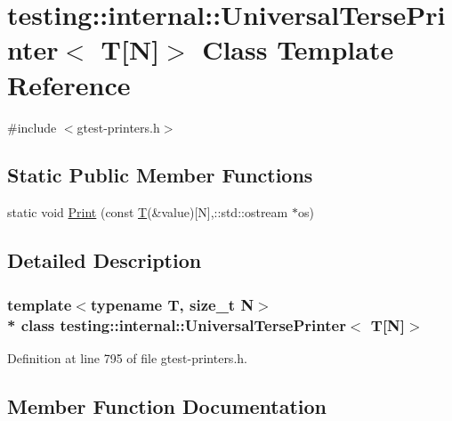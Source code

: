 \hypertarget{classtesting_1_1internal_1_1_universal_terse_printer_3_01_t[_n]_4}{}\section{testing\+:\+:internal\+:\+:Universal\+Terse\+Printer$<$ T\mbox{[}N\mbox{]}$>$ Class Template Reference}
\label{classtesting_1_1internal_1_1_universal_terse_printer_3_01_t[_n]_4}


{\ttfamily \#include $<$gtest-\/printers.\+h$>$}

\subsection*{Static Public Member Functions}
\begin{DoxyCompactItemize}
\item 
static void \hyperlink{classtesting_1_1internal_1_1_universal_terse_printer_3_01_t[_n]_4_ab86be2fbff7bb8fb2113e9ade3899a56}{Print} (const \hyperlink{functions__7_8js_adf1f3edb9115acb0a1e04209b7a9937b}{T}(\&value)\mbox{[}N\mbox{]},\+::std\+::ostream $\ast$os)
\end{DoxyCompactItemize}


\subsection{Detailed Description}
\subsubsection*{template$<$typename T, size\+\_\+t N$>$\\*
class testing\+::internal\+::\+Universal\+Terse\+Printer$<$ T\mbox{[}\+N\mbox{]}$>$}



Definition at line 795 of file gtest-\/printers.\+h.



\subsection{Member Function Documentation}
